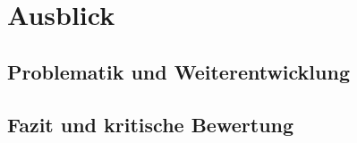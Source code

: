 \chapter{Ausblick}
\label{cha:ausblick}


\section{Problematik und Weiterentwicklung} %
\section{Fazit und kritische Bewertung} %